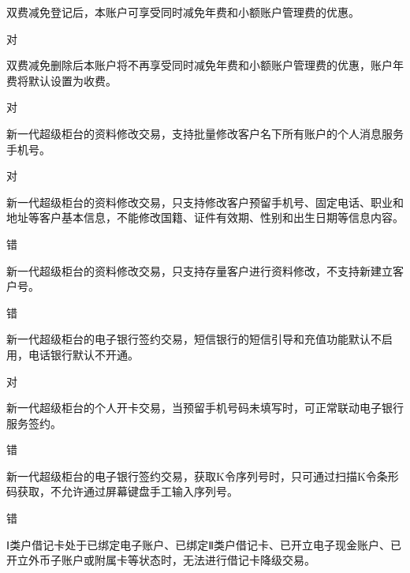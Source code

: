 \documentclass[kindlepaper]{BHCexam4kindle}
\begin{document}
\begin{questions}
\qs 双费减免登记后，本账户可享受同时减免年费和小额账户管理费的优惠。 \xx
\begin{solution} 对 \end{solution}
\qs 双费减免删除后本账户将不再享受同时减免年费和小额账户管理费的优惠，账户年费将默认设置为收费。 \xx
\begin{solution} 对 \end{solution}
\qs 新一代超级柜台的资料修改交易，支持批量修改客户名下所有账户的个人消息服务手机号。 \xx
\begin{solution} 对 \end{solution}
\qs 新一代超级柜台的资料修改交易，只支持修改客户预留手机号、固定电话、职业和地址等客户基本信息，不能修改国籍、证件有效期、性别和出生日期等信息内容。 \xx
\begin{solution} 错 \end{solution}
\qs 新一代超级柜台的资料修改交易，只支持存量客户进行资料修改，不支持新建立客户号。 \xx
\begin{solution} 错 \end{solution}
\qs 新一代超级柜台的电子银行签约交易，短信银行的短信引导和充值功能默认不启用，电话银行默认不开通。 \xx
\begin{solution} 对 \end{solution}
\qs 新一代超级柜台的个人开卡交易，当预留手机号码未填写时，可正常联动电子银行服务签约。 \xx
\begin{solution} 错 \end{solution}
\qs 新一代超级柜台的电子银行签约交易，获取K令序列号时，只可通过扫描K令条形码获取，不允许通过屏幕键盘手工输入序列号。 \xx
\begin{solution} 错 \end{solution}
\qs Ⅰ类户借记卡处于已绑定电子账户、已绑定Ⅱ类户借记卡、已开立电子现金账户、已开立外币子账户或附属卡等状态时，无法进行借记卡降级交易。 \xx

\end{questions}
\end{document}
